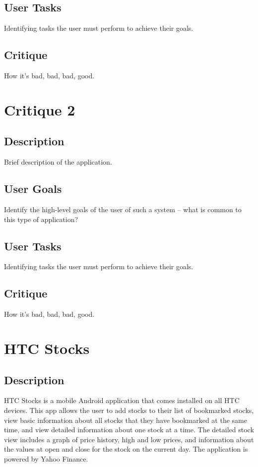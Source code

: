 \documentclass{sigchi}
\begin{document}
\subsection{User Tasks}
Identifying tasks the user must perform to achieve their goals.

\subsection{Critique}
How it's bad, bad, bad, good.



\section{Critique 2}
\subsection{Description}
Brief description of the application.

\subsection{User Goals}
Identify the high-level goals of the user of such a system – what is common to this type of
application?

\subsection{User Tasks}
Identifying tasks the user must perform to achieve their goals.

\subsection{Critique}
How it's bad, bad, bad, good.



\section{HTC Stocks}
\subsection{Description}
HTC Stocks is a mobile Android application that comes installed on all HTC devices.  This app allows the user to add stocks to their list of bookmarked stocks, view basic information about all stocks that they have bookmarked at the same time, and view detailed information about one stock at a time.  The detailed stock view includes a graph of price history, high and low prices, and information about the values at open and close for the stock on the current day.  The application is powered by Yahoo Finance.
\end{document}

